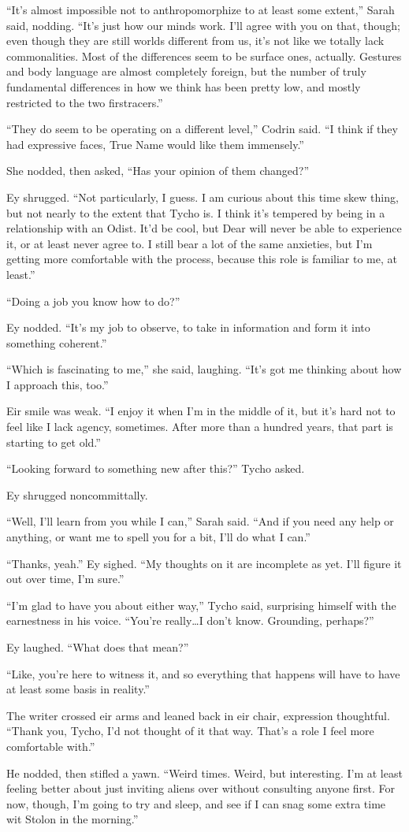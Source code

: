 ``It's almost impossible not to anthropomorphize to at least some extent,'' Sarah said, nodding. ``It's just how our minds work. I'll agree with you on that, though; even though they are still worlds different from us, it's not like we totally lack commonalities. Most of the differences seem to be surface ones, actually. Gestures and body language are almost completely foreign, but the number of truly fundamental differences in how we think has been pretty low, and mostly restricted to the two firstracers.''

``They do seem to be operating on a different level,'' Codrin said. ``I think if they had expressive faces, True Name would like them immensely.''

She nodded, then asked, ``Has your opinion of them changed?''

Ey shrugged. ``Not particularly, I guess. I am curious about this time skew thing, but not nearly to the extent that Tycho is. I think it's tempered by being in a relationship with an Odist. It'd be cool, but Dear will never be able to experience it, or at least never agree to. I still bear a lot of the same anxieties, but I'm getting more comfortable with the process, because this role is familiar to me, at least.''

``Doing a job you know how to do?''

Ey nodded. ``It's my job to observe, to take in information and form it into something coherent.''

``Which is fascinating to me,'' she said, laughing. ``It's got me thinking about how I approach this, too.''

Eir smile was weak. ``I enjoy it when I'm in the middle of it, but it's hard not to feel like I lack agency, sometimes. After more than a hundred years, that part is starting to get old.''

``Looking forward to something new after this?'' Tycho asked.

Ey shrugged noncommittally.

``Well, I'll learn from you while I can,'' Sarah said. ``And if you need any help or anything, or want me to spell you for a bit, I'll do what I can.''

``Thanks, yeah.'' Ey sighed. ``My thoughts on it are incomplete as yet. I'll figure it out over time, I'm sure.''

``I'm glad to have you about either way,'' Tycho said, surprising himself with the earnestness in his voice. ``You're really\ldots I don't know. Grounding, perhaps?''

Ey laughed. ``What does that mean?''

``Like, you're here to witness it, and so everything that happens will have to have at least some basis in reality.''

The writer crossed eir arms and leaned back in eir chair, expression thoughtful. ``Thank you, Tycho, I'd not thought of it that way. That's a role I feel more comfortable with.''

He nodded, then stifled a yawn. ``Weird times. Weird, but interesting. I'm at least feeling better about just inviting aliens over without consulting anyone first. For now, though, I'm going to try and sleep, and see if I can snag some extra time wit Stolon in the morning.''
